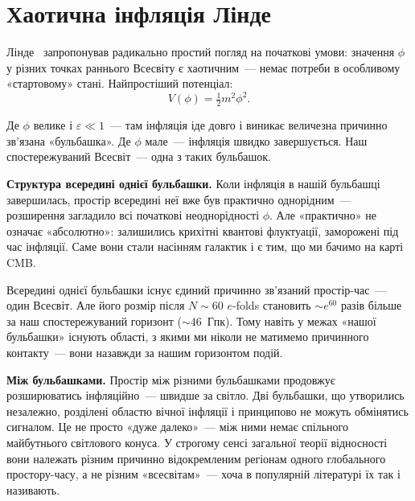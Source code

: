 
\chapter{Хаотична інфляція Лінде}
\label{sec:chaotic}

Лінде~\cite{linde_1983} запропонував радикально простий погляд
на початкові умови: значення $\phi$ у різних точках раннього
Всесвіту є хаотичним~--- немає потреби в особливому «стартовому»
стані. Найпростіший потенціал:
\begin{equation*}
  V(\phi) = \tfrac{1}{2}m^2\phi^2.
\end{equation*}

Де $\phi$ велике і $\varepsilon \ll 1$~--- там інфляція іде довго
і виникає величезна причинно зв'язана «бульбашка». Де $\phi$ мале~---
інфляція швидко завершується. Наш спостережуваний Всесвіт~---
одна з таких бульбашок.

\textbf{Структура всередині однієї бульбашки.} Коли інфляція
в нашій бульбашці завершилась, простір всередині неї вже був
практично однорідним~--- розширення загладило всі початкові
неоднорідності $\phi$. Але «практично» не означає «абсолютно»:
залишились крихітні квантові флуктуації, заморожені під час
інфляції. Саме вони стали насінням галактик і є тим, що ми
бачимо на карті CMB.

Всередині однієї бульбашки існує єдиний причинно зв'язаний
простір-час~--- один Всесвіт. Але його розмір після $N \sim 60$
$e$-folds становить $\sim e^{60}$ разів більше за наш
спостережуваний горизонт ($\sim 46$~Гпк). Тому навіть у
межах «нашої бульбашки» існують області, з якими ми ніколи
не матимемо причинного контакту~--- вони назавжди за
нашим горизонтом подій.

\textbf{Між бульбашками.} Простір між різними бульбашками
продовжує розширюватись інфляційно~--- швидше за світло.
Дві бульбашки, що утворились незалежно, розділені областю
вічної інфляції і принципово не можуть обмінятись сигналом.
Це не просто «дуже далеко»~--- між ними немає спільного
майбутнього світлового конуса. У строгому сенсі загальної теорії відносності вони
належать різним причинно відокремленим регіонам
одного глобального простору-часу, а не різним «всесвітам»~---
хоча в популярній літературі їх так і називають.

